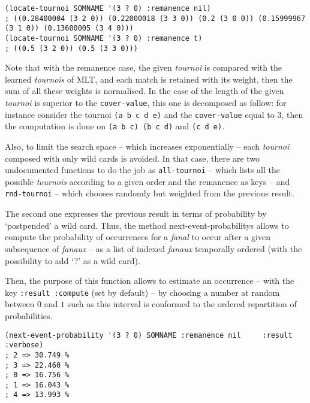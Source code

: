 \bigskip
\begin{lstlisting}[language=N3]
(locate-tournoi SOMNAME '(3 ? 0) :remanence nil)
; ((0.28400004 (3 2 0)) (0.22000018 (3 3 0)) (0.2 (3 0 0)) (0.15999967 (3 1 0)) (0.13600005 (3 4 0)))
(locate-tournoi SOMNAME '(3 ? 0) :remanence t)
; ((0.5 (3 2 0)) (0.5 (3 3 0)))
\end{lstlisting}
\bigskip

Note that with the remanence case, the given \textit{tournoi} is compared with the learned \textit{tournois} of MLT, and each match is retained with its weight, then the sum of all these weights is normalised. In the case of the length of the given \textit{tournoi} is superior to the \texttt{cover-value}, this one is decomposed as follow: for instance consider the tournoi \texttt{(a b c d e)} and the \texttt{cover-value} equal to 3, then the computation is done on \texttt{(a b c) (b c d)} and  \texttt{(c d e)}.

\smallskip

Also, to limit the search space -- which increases exponentially -- each \textit{tournoi} composed with only wild cards is avoided. In that case, there are two undocumented functions to do the job as \texttt{all-tournoi} -- which lists all the possible \textit{tournois} according to a given order and the remanence as keys -- and \texttt{rnd-tournoi} -- which chooses randomly but weighted from the previous result.

\bigskip

The second one expresses the previous result in terms of probability by `postpended' a wild card. 
Thus, the method \glspl{next-event-probability} allows to compute the probability of occurrences for a \textit{fanal} to occur after a given subsequence of \textit{fanaux} -- as a list of indexed \textit{fanaux} temporally ordered (with the possibility to add `?' as a wild card).

\smallskip

Then, the purpose of this function allows to estimate an occurrence -- with the key \texttt{:result :compute} (set by default) -- by choosing a number at random between $0$ and $1$ such as this interval is conformed to the ordered repartition of probabilities.

\bigskip

\begin{lstlisting}[language=N3]
(next-event-probability '(3 ? 0) SOMNAME :remanence nil     :result :verbose) 
; 2 => 30.749 %
; 3 => 22.460 %
; 0 => 16.756 %
; 1 => 16.043 %
; 4 => 13.993 %
\end{lstlisting}

